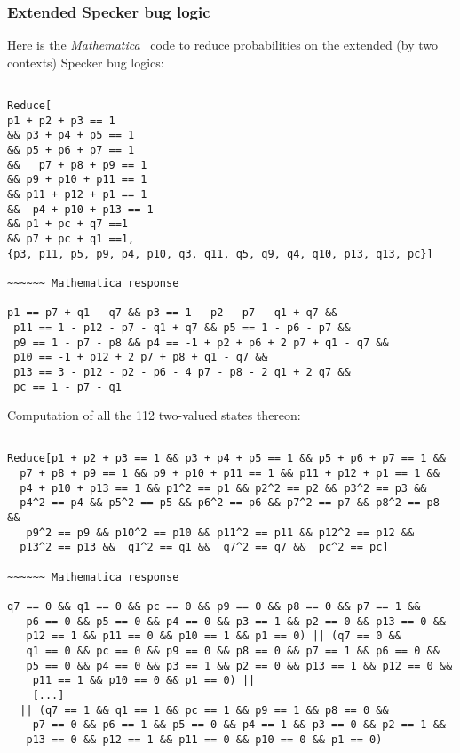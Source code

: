 \documentclass[%
  twocolumn,
 showpacs,
 showkeys,
 preprintnumbers,
 amsmath,amssymb,
 aps,
  pra,
  longbibliography,
 floatfix,
 ]{revtex4-1}
\begin{document}
\subsubsection{Extended Specker bug logic}

Here is the {\em Mathematica}~\cite{Mathematica11.1} code to reduce probabilities on the extended (by two contexts) Specker bug logics:

{ \begin{lstlisting}[backgroundcolor=\color{yellow!10},framerule=0pt,breaklines=true, frame=tb]

Reduce[
p1 + p2 + p3 == 1
&& p3 + p4 + p5 == 1
&& p5 + p6 + p7 == 1
&&   p7 + p8 + p9 == 1
&& p9 + p10 + p11 == 1
&& p11 + p12 + p1 == 1
&&  p4 + p10 + p13 == 1
&& p1 + pc + q7 ==1
&& p7 + pc + q1 ==1,
{p3, p11, p5, p9, p4, p10, q3, q11, q5, q9, q4, q10, p13, q13, pc}]

~~~~~~ Mathematica response

p1 == p7 + q1 - q7 && p3 == 1 - p2 - p7 - q1 + q7 &&
 p11 == 1 - p12 - p7 - q1 + q7 && p5 == 1 - p6 - p7 &&
 p9 == 1 - p7 - p8 && p4 == -1 + p2 + p6 + 2 p7 + q1 - q7 &&
 p10 == -1 + p12 + 2 p7 + p8 + q1 - q7 &&
 p13 == 3 - p12 - p2 - p6 - 4 p7 - p8 - 2 q1 + 2 q7 &&
 pc == 1 - p7 - q1

\end{lstlisting}  }

Computation of all the 112 two-valued states thereon:


{ \begin{lstlisting}[backgroundcolor=\color{yellow!10},framerule=0pt,breaklines=true, frame=tb]

Reduce[p1 + p2 + p3 == 1 && p3 + p4 + p5 == 1 && p5 + p6 + p7 == 1 &&
  p7 + p8 + p9 == 1 && p9 + p10 + p11 == 1 && p11 + p12 + p1 == 1 &&
  p4 + p10 + p13 == 1 && p1^2 == p1 && p2^2 == p2 && p3^2 == p3 &&
  p4^2 == p4 && p5^2 == p5 && p6^2 == p6 && p7^2 == p7 && p8^2 == p8 &&
   p9^2 == p9 && p10^2 == p10 && p11^2 == p11 && p12^2 == p12 &&
  p13^2 == p13 &&  q1^2 == q1 &&  q7^2 == q7 &&  pc^2 == pc]

~~~~~~ Mathematica response

q7 == 0 && q1 == 0 && pc == 0 && p9 == 0 && p8 == 0 && p7 == 1 &&
   p6 == 0 && p5 == 0 && p4 == 0 && p3 == 1 && p2 == 0 && p13 == 0 &&
   p12 == 1 && p11 == 0 && p10 == 1 && p1 == 0) || (q7 == 0 &&
   q1 == 0 && pc == 0 && p9 == 0 && p8 == 0 && p7 == 1 && p6 == 0 &&
   p5 == 0 && p4 == 0 && p3 == 1 && p2 == 0 && p13 == 1 && p12 == 0 &&
    p11 == 1 && p10 == 0 && p1 == 0) ||
    [...]
  || (q7 == 1 && q1 == 1 && pc == 1 && p9 == 1 && p8 == 0 &&
    p7 == 0 && p6 == 1 && p5 == 0 && p4 == 1 && p3 == 0 && p2 == 1 &&
   p13 == 0 && p12 == 1 && p11 == 0 && p10 == 0 && p1 == 0)

\end{lstlisting}  }
\end{document}
